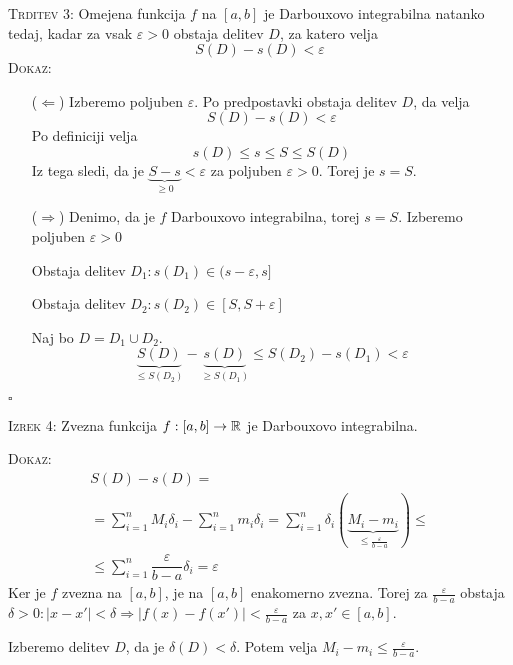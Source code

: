 \textsc{Trditev 3:} Omejena funkcija $f$ na $[a, b]$ je Darbouxovo integrabilna natanko tedaj, kadar za vsak $\varepsilon > 0$ obstaja delitev $D$, za katero velja
\begin{equation*}
S(D) - s(D) < \varepsilon
\end{equation*}
\textsc{Dokaz:}
\begin{itemize}
	\item[($\Leftarrow$)] Izberemo poljuben $\varepsilon$. Po predpostavki obstaja delitev $D$, da velja
	\begin{equation*}
	S(D) - s(D) < \varepsilon
	\end{equation*}
	Po definiciji velja
	\begin{equation*}
	s(D) \leq s \leq S \leq S(D)
	\end{equation*}
	Iz tega sledi, da je $\underbrace{S - s}_{\geq 0} < \varepsilon$ za poljuben $\varepsilon > 0$. Torej je $s = S$.
	
	\item[($\Rightarrow$)] Denimo, da je $f$ Darbouxovo integrabilna, torej $s = S$. Izberemo poljuben $\varepsilon > 0$
	
	Obstaja delitev $D_1: s(D_1) \in (s-\varepsilon, s]$
	
	Obstaja delitev $D_2: s(D_2) \in [S, S+ \varepsilon]$
	
	Naj bo $D = D_1 \cup D_2$. 
	\begin{equation*}
	\underbrace{S(D)}_{\leq S(D_2)} - \underbrace{s(D)}_{\geq S(D_1)} \leq S(D_2) - s(D_1) < \varepsilon
	\end{equation*}
\end{itemize}
\hfill $\square$

\textsc{Izrek 4:} Zvezna funkcija $f: [a, b] \to \mathbb{R}$ je Darbouxovo integrabilna.

\textsc{Dokaz:}
\begin{multline*}
S(D) - s(D) = \\
= \sum_{i = 1}^{n} M_i \delta_i - \sum_{i = 1}^{n} m_i \delta_i = \sum_{i=1}^{n} \delta_i (\underbrace{M_i - m_i}_{\leq \frac{\varepsilon}{b-a}}) \leq \\
\leq \sum_{i = 1}^{n} \dfrac{\varepsilon}{b-a} \delta_i = \varepsilon 
\end{multline*}
Ker je $f$ zvezna na $[a, b]$, je na $[a, b]$ enakomerno zvezna. Torej za $\frac{\varepsilon}{b-a}$ obstaja $\delta > 0: |x - x'| < \delta \Rightarrow |f(x) - f(x')| < \frac{\varepsilon}{b-a}$ za $x, x' \in [a, b]$.

Izberemo delitev $D$, da je $\delta(D) < \delta$. Potem velja $M_i - m_i \leq \frac{\varepsilon}{b-a}$.

